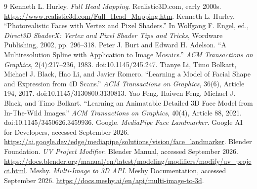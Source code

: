 \documentclass[10pt]{article}
\begin{document}
\begin{thebibliography}{9}
 Kenneth L. Hurley. \emph{Full Head Mapping}. Realistic3D.com, early 2000s. \url{https://www.realistic3d.com/Full_Head_Mapping.htm}.
 Kenneth L. Hurley. ``Photorealistic Faces with Vertex and Pixel Shaders.'' In Wolfgang F. Engel, ed., \emph{Direct3D ShaderX: Vertex and Pixel Shader Tips and Tricks}, Wordware Publishing, 2002, pp. 296--318.
 Peter J. Burt and Edward H. Adelson. ``A Multiresolution Spline with Application to Image Mosaics.'' \emph{ACM Transactions on Graphics}, 2(4):217--236, 1983. doi:10.1145/245.247.
 Tianye Li, Timo Bolkart, Michael J. Black, Hao Li, and Javier Romero. ``Learning a Model of Facial Shape and Expression from 4D Scans.'' \emph{ACM Transactions on Graphics}, 36(6), Article 194, 2017. doi:10.1145/3130800.3130813.
 Yao Feng, Haiwen Feng, Michael J. Black, and Timo Bolkart. ``Learning an Animatable Detailed 3D Face Model from In-The-Wild Images.'' \emph{ACM Transactions on Graphics}, 40(4), Article 88, 2021. doi:10.1145/3450626.3459936.
 Google. \emph{MediaPipe Face Landmarker}. Google AI for Developers, accessed September 2026. \url{https://ai.google.dev/edge/mediapipe/solutions/vision/face_landmarker}.
 Blender Foundation. \emph{UV Project Modifier}. Blender Manual, accessed September 2026. \url{https://docs.blender.org/manual/en/latest/modeling/modifiers/modify/uv_project.html}.
 Meshy. \emph{Multi-Image to 3D API}. Meshy Documentation, accessed September 2026. \url{https://docs.meshy.ai/en/api/multi-image-to-3d}.
\end{thebibliography}
\end{document}
